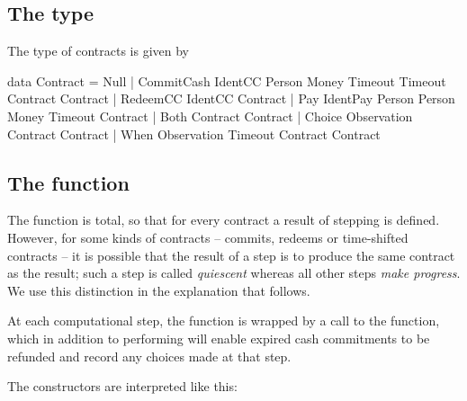 \documentclass[
      acmsmall
    , screen
  ]{acmart}
\begin{document}
\subsection{The  type}

The type of contracts is given by

\begin{haskellcode}
data Contract =
   Null |
   CommitCash IdentCC Person Money Timeout Timeout Contract Contract |  
   RedeemCC IdentCC Contract |
   Pay IdentPay Person Person Money Timeout Contract |  
   Both Contract Contract |
   Choice Observation Contract Contract |
   When Observation Timeout Contract Contract   
   \end{haskellcode}

\subsection{The  function}


The  function is total, so that for every contract a result of stepping is defined. However, for some kinds of contracts -- commits, redeems or time-shifted contracts -- it is possible that the result of a step is to produce the same contract as the result; such a step is called \emph{quiescent} whereas all other steps \emph{make progress}. We use this distinction in the explanation that follows.


At each computational step, the  function is wrapped by a call to the  function, which in addition to performing  will enable expired cash commitments to be refunded and record any choices made at that step.


The constructors are interpreted like this:
\end{document}

